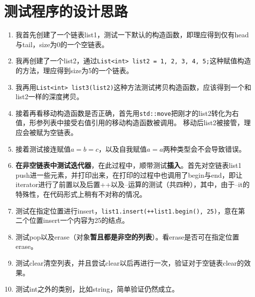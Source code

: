 \documentclass[UTF8]{ctexart}
\begin{document}
\pagestyle{fancy}
\fancyhead{}

\section{测试程序的设计思路}



\begin{enumerate}

    \item 我首先创建了一个链表list1，测试一下默认的构造函数，即理应得到仅有head与tail，size为0的一个空链表。

    \item  我再创建了一个list2，通过\texttt{List<int> list2 = {1, 2, 3, 4, 5};}这种赋值构造的方法，理应得到size为5的一个链表。

    \item 我再用\texttt{List<int> list3(list2)}这种方法测试拷贝构造函数，应该得到一个和list2一样的深度拷贝。

    \item 接着再看移动构造函数是否正确，首先用\texttt{std::move}把刚才的list2转化为右值，形参列表中接受右值引用的移动构造函数被调用。
    移动后list2被接管，理应会被赋为空链表。

    \item 接着测试接连赋值$a=b=c$，以及自我赋值$a=a$两种类型会不会导致错误。

    \item \textbf{在非空链表中测试迭代器}，在此过程中，顺带测试\textbf{插入}。首先对空链表list1 push进一些元素，并打印出来，在打印的过程中也调用了begin与end，即让iterator进行了前置以及后置++以及--运算的测试（共四种），其中，由于--it的特殊性，在代码形式上稍有不对称的情况。

    \item 测试在指定位置进行insert，\texttt{list1.insert(++list1.begin(), 25)}，意在第二个位置insert一个内容为25的结点。

    \item 测试pop以及erase（对象\textbf{暂且都是非空的列表}）。看erase是否可在指定位置erase。

    \item 测试clear清空列表，并且尝试clear以后再进行一次，验证对于空链表clear的效果。

    \item 测试int之外的类别，比如string，简单验证仍然成立。

\end{enumerate}
\end{document}
